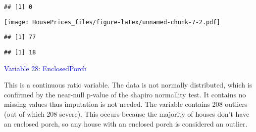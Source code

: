 \documentclass[
]{article}
\newenvironment{Shaded}{\begin{snugshade}}{\end{snugshade}}
\newcommand{\AttributeTok}[1]{\textcolor[rgb]{0.13,0.29,0.53}{#1}}
\newcommand{\CommentTok}[1]{\textcolor[rgb]{0.56,0.35,0.01}{\textit{#1}}}
\newcommand{\ConstantTok}[1]{\textcolor[rgb]{0.56,0.35,0.01}{#1}}
\newcommand{\DecValTok}[1]{\textcolor[rgb]{0.00,0.00,0.81}{#1}}
\newcommand{\FloatTok}[1]{\textcolor[rgb]{0.00,0.00,0.81}{#1}}
\newcommand{\FunctionTok}[1]{\textcolor[rgb]{0.13,0.29,0.53}{\textbf{#1}}}
\newcommand{\NormalTok}[1]{#1}
\newcommand{\OtherTok}[1]{\textcolor[rgb]{0.56,0.35,0.01}{#1}}
\newcommand{\SpecialCharTok}[1]{\textcolor[rgb]{0.81,0.36,0.00}{\textbf{#1}}}
\begin{document}
\begin{verbatim}
## [1] 0
\end{verbatim}

\begin{Shaded}
\end{Shaded}

\texttt{[image: HousePrices\_files/figure-latex/unnamed-chunk-7-2.pdf]}

\begin{verbatim}
## [1] 77
\end{verbatim}

\begin{Shaded}
\end{Shaded}

\begin{verbatim}
## [1] 18
\end{verbatim}

\textcolor{blue}{Variable 28: EnclosedPorch}

This is a continuous ratio variable. The data is not normally
distributed, which is confirmed by the near-null p-value of the shapiro
normallity test. It contains no missing values thus imputation is not
needed. The variable contains 208 outliers (out of which 208 severe).
This occurs because the majority of houses don't have an enclosed porch,
so any house with an enclosed porch is considered an outlier.
\end{document}
